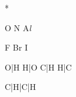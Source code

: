 \newcommand {\sigmabond}	{σ}


			{{*}}

			{{\color{Red}O}}
			{{\color{RoyalBlue}N}}
			{A\textit{l}}

			{{\color{Tan!80!Black}F}}
			{{\color{OliveGreen}\chlorine}}
			{{\color{Mahogany}Br}}
			{{\color{Sepia}I}}

			{{\color{Red}O}|{\color{Red}H}}				%
			{{\color{Red}H}|{\color{Red}O}}				%
			{C|H}								%
			{H|C}								%

		{C|H|C|H}						%










\newenvironment{bulletlist}
{
	\begin{easylist}[itemize]
	\ListProperties(Space*=-1.0em, Space=-1.0em)
}
{\end{easylist}}


\newenvironment{romanlist}
{
	\begin{easylist}[enumerate]
	\ListProperties(Space*=-1.0em, Space=-1.0em, Numbers=r)
}
{\end{easylist}}


